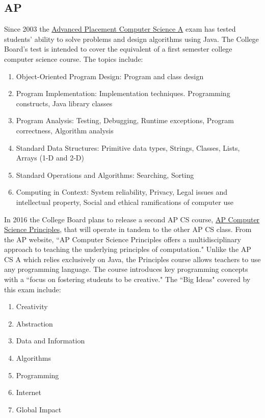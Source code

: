 \subsection{AP}
Since 2003 the \href{http://media.collegeboard.com/digitalServices/pdf/ap/ap-course-overviews/ap-computer-science-a-course-overview.pdf}{Advanced Placement Computer Science A} exam has tested students' ability to solve problems and design algorithms using Java. The College Board's test is intended to cover the equivalent of a first semester college computer science course. The topics include:
\begin{enumerate}
	\item Object-Oriented Program Design:  Program and class design 
	\item Program Implementation: Implementation techniques. Programming constructs, Java library classes
	\item Program Analysis: Testing, Debugging, Runtime exceptions, Program correctness, Algorithm analysis
	\item Standard Data Structures:  Primitive data types, Strings, Classes, Lists, Arrays (1-D and 2-D) 
	\item Standard Operations and Algorithms: Searching, Sorting
	\item Computing in Context: System reliability, Privacy, Legal issues and intellectual property, Social and ethical ramifications of computer use 
\end{enumerate}
\newenvironment{blockquote}{%
  \par%
  \medskip
  \leftskip=4em\rightskip=4em%
  \noindent\ignorespaces}{%
  \par\medskip}
In 2016 the College Board plans to release a second AP CS course, \href{https://secure-media.collegeboard.org/digitalServices/pdf/ap/ap-computer-science-principles-curriculum-framework.pdf}{AP Computer Science Principles}, that will operate in tandem to the other AP CS class. From the AP website, ``AP Computer Science Principles offers a multidisciplinary approach to teaching the underlying principles of computation." Unlike the AP CS A which relies exclusively on Java, the Principles course allows teachers to use any programming language. The course introduces key programming concepts with a ``focus on fostering students to be creative." The ``Big Ideas" covered by this exam include:
\begin{enumerate}
	\item Creativity
	\item Abstraction
	\item Data and Information
	\item Algorithms
	\item Programming
	\item Internet
	\item Global Impact
\end{enumerate} \par
